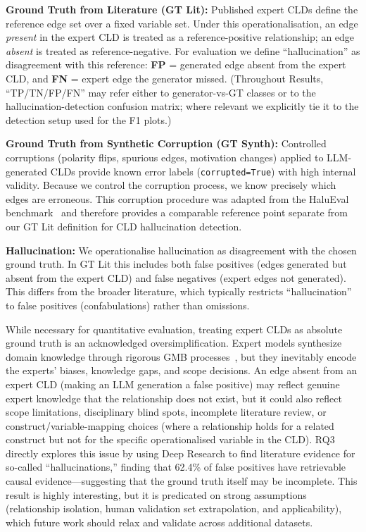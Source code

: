 \textbf{Ground Truth from Literature (GT Lit):} Published expert CLDs define the reference edge set over a fixed variable set. Under this operationalisation, an edge \textit{present} in the expert CLD is treated as a reference-positive relationship; an edge \textit{absent} is treated as reference-negative. For evaluation we define ``hallucination'' as disagreement with this reference: \textbf{FP} = generated edge absent from the expert CLD, and \textbf{FN} = expert edge the generator missed. (Throughout Results, ``TP/TN/FP/FN'' may refer either to generator-vs-GT classes or to the hallucination-detection confusion matrix; where relevant we explicitly tie it to the detection setup used for the F1 plots.)

\textbf{Ground Truth from Synthetic Corruption (GT Synth):} Controlled corruptions (polarity flips, spurious edges, motivation changes) applied to LLM-generated CLDs provide known error labels (\texttt{corrupted=True}) with high internal validity. Because we control the corruption process, we know precisely which edges are erroneous. This corruption procedure was adapted from the HaluEval benchmark~\citep{li2023halueval} and therefore provides a comparable reference point separate from our GT Lit definition for CLD hallucination detection.

\textbf{Hallucination:} We operationalise hallucination as disagreement with the chosen ground truth. In GT Lit this includes both false positives (edges generated but absent from the expert CLD) and false negatives (expert edges not generated). This differs from the broader literature, which typically restricts ``hallucination'' to false positives (confabulations) rather than omissions.

While necessary for quantitative evaluation, treating expert CLDs as absolute ground truth is an acknowledged oversimplification. Expert models synthesize domain knowledge through rigorous GMB processes~\citep{crielaard2024refining}, but they inevitably encode the experts' biases, knowledge gaps, and scope decisions. An edge absent from an expert CLD (making an LLM generation a false positive) may reflect genuine expert knowledge that the relationship does not exist, but it could also reflect scope limitations, disciplinary blind spots, incomplete literature review, or construct/variable-mapping choices (where a relationship holds for a related construct but not for the specific operationalised variable in the CLD). RQ3 directly explores this issue by using Deep Research to find literature evidence for so-called ``hallucinations,'' finding that 62.4\% of false positives have retrievable causal evidence---suggesting that the ground truth itself may be incomplete. This result is highly interesting, but it is predicated on strong assumptions (relationship isolation, human validation set extrapolation, and applicability), which future work should relax and validate across additional datasets.

